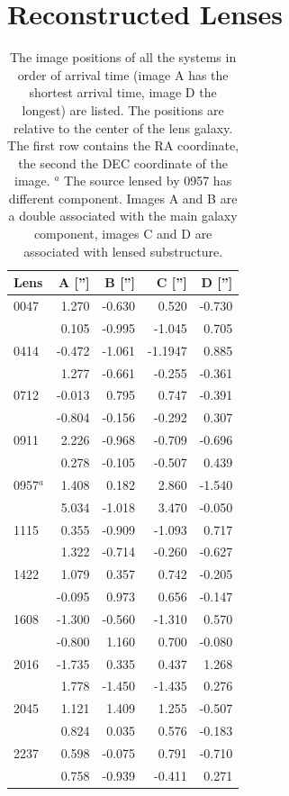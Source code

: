 \documentclass[useAMS,usenatbib]{mn2e}
\begin{document}
\section{Reconstructed Lenses}\label{sec:reconstructions}
\begin{table}
  \begin{center}
    \begin{tabular}{l r r r r}
      Lens & A [''] & B [''] & C [''] & D [''] \\ \hline
      0047 & 1.270 & -0.630 & 0.520 & -0.730 \\
           & 0.105 & -0.995 & -1.045 & 0.705 \\
      0414 & -0.472 & -1.061 & -1.1947 & 0.885 \\
           & 1.277 & -0.661 & -0.255 & -0.361 \\
      0712 & -0.013 & 0.795 & 0.747 & -0.391 \\
           & -0.804 & -0.156 & -0.292 & 0.307 \\
      0911 & 2.226 & -0.968 & -0.709 & -0.696 \\
           & 0.278 & -0.105 & -0.507 & 0.439 \\
      0957$^{a}$ & 1.408 & 0.182 & 2.860 & -1.540 \\
           & 5.034 & -1.018 & 3.470 & -0.050 \\
      1115 & 0.355 & -0.909 & -1.093 & 0.717 \\
           & 1.322 & -0.714 & -0.260 & -0.627 \\
      1422 & 1.079 & 0.357 & 0.742 & -0.205 \\
           & -0.095 & 0.973 & 0.656 & -0.147 \\
      1608 & -1.300 & -0.560 & -1.310 & 0.570 \\
           & -0.800 & 1.160 & 0.700 & -0.080 \\
      2016 & -1.735 & 0.335 & 0.437 & 1.268 \\
           & 1.778 & -1.450 & -1.435 & 0.276 \\
      2045 & 1.121 & 1.409 & 1.255 & -0.507 \\
           & 0.824 & 0.035 & 0.576 & -0.183 \\
      2237 & 0.598 & -0.075 & 0.791 & -0.710 \\
           & 0.758 & -0.939 & -0.411 & 0.271 \\
    \end{tabular}
    \caption[width=\linewidth]{The image positions of all the systems in order of arrival time (image A has the shortest arrival time, image D the longest) are listed. The positions are relative to the center of the lens galaxy. The first row contains the RA coordinate, the second the DEC coordinate of the image. \newline $^{a}$ The source lensed by 0957 has different component. Images A and B are a double associated with the main galaxy component, images C and D are associated with lensed substructure.}
    \label{tab:lenspositions}
  \end{center}
\end{table}
\end{document}
